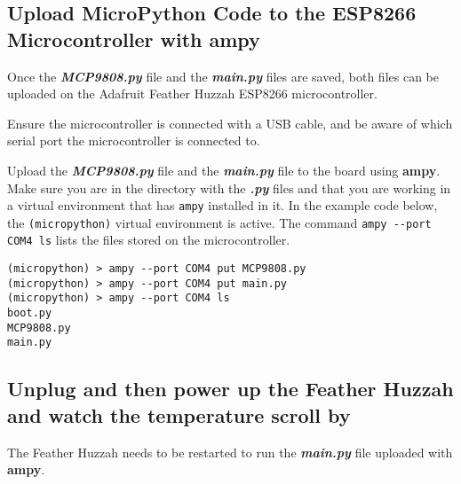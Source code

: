 \documentclass{book}
\newcommand{\passthrough}[1]{#1}
\begin{document}
    
        \hypertarget{upload-micropython-code-to-the-esp8266-microcontroller-with-ampy}{%
\subsection{\texorpdfstring{Upload MicroPython Code to the ESP8266
Microcontroller with
\textbf{ampy}}{Upload MicroPython Code to the ESP8266 Microcontroller with ampy}}\label{upload-micropython-code-to-the-esp8266-microcontroller-with-ampy}}
    




    
        Once the \textbf{\emph{MCP9808.py}} file and the \textbf{\emph{main.py}}
files are saved, both files can be uploaded on the Adafruit Feather
Huzzah ESP8266 microcontroller.

Ensure the microcontroller is connected with a USB cable, and be aware
of which serial port the microcontroller is connected to.

Upload the \textbf{\emph{MCP9808.py}} file and the
\textbf{\emph{main.py}} file to the board using \textbf{ampy}. Make sure
you are in the directory with the \textbf{\emph{.py}} files and that you
are working in a virtual environment that has
\passthrough{\lstinline!ampy!} installed in it. In the example code
below, the \passthrough{\lstinline!(micropython)!} virtual environment
is active. The command \passthrough{\lstinline!ampy --port COM4 ls!}
lists the files stored on the microcontroller.

\begin{lstlisting}
(micropython) > ampy --port COM4 put MCP9808.py
(micropython) > ampy --port COM4 put main.py
(micropython) > ampy --port COM4 ls
boot.py
MCP9808.py
main.py
\end{lstlisting}
    




    
        \hypertarget{unplug-and-then-power-up-the-feather-huzzah-and-watch-the-temperature-scroll-by}{%
\subsection{Unplug and then power up the Feather Huzzah and watch the
temperature scroll
by}\label{unplug-and-then-power-up-the-feather-huzzah-and-watch-the-temperature-scroll-by}}
    




    
        The Feather Huzzah needs to be restarted to run the
\textbf{\emph{main.py}} file uploaded with \textbf{ampy}.
\end{document}

